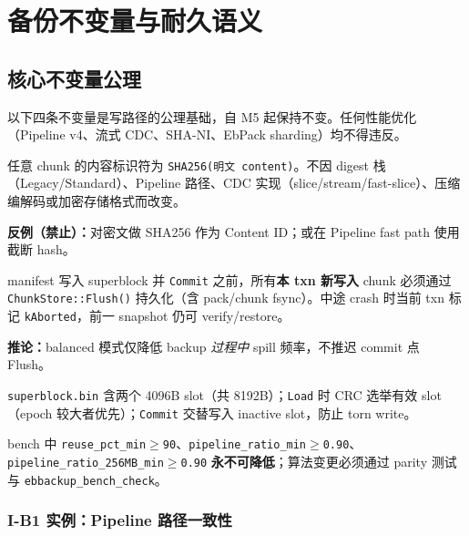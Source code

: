 \chapter{备份不变量与耐久语义}
\label{ch:invariants}

\section{核心不变量公理}

以下四条不变量是写路径的公理基础，自 M5 起保持不变。任何性能优化（Pipeline v4、流式 CDC、SHA-NI、EbPack sharding）均不得违反。

\begin{invariantbox}[I-B1：Content ID 恒定]
任意 chunk 的内容标识符为 \texttt{SHA256(明文 content)}。不因 digest 栈（Legacy/Standard）、Pipeline 路径、CDC 实现（slice/stream/fast-slice）、压缩编解码或加密存储格式而改变。

\textbf{反例（禁止）：}对密文做 SHA256 作为 Content ID；或在 Pipeline fast path 使用截断 hash。
\end{invariantbox}

\begin{invariantbox}[I-B2：提交点耐久性]
manifest 写入 superblock 并 \texttt{Commit} 之前，所有\textbf{本 txn 新写入} chunk 必须通过 \texttt{ChunkStore::Flush()} 持久化（含 pack/chunk fsync）。中途 crash 时当前 txn 标记 \texttt{kAborted}，前一 snapshot 仍可 verify/restore。

\textbf{推论：}balanced 模式仅降低 backup \emph{过程中} spill 频率，不推迟 commit 点 Flush。
\end{invariantbox}

\begin{invariantbox}[I-B3：SuperBlock 双槽]
\texttt{superblock.bin} 含两个 4096B slot（共 8192B）；\texttt{Load} 时 CRC 选举有效 slot（epoch 较大者优先）；\texttt{Commit} 交替写入 inactive slot，防止 torn write。
\end{invariantbox}

\begin{invariantbox}[I-B4：Immutable CI 门禁]
bench 中 \texttt{reuse\_pct\_min$\geq$90}、\texttt{pipeline\_ratio\_min$\geq$0.90}、\texttt{pipeline\_ratio\_256MB\_min$\geq$0.90} \textbf{永不可降低}；算法变更必须通过 parity 测试与 \texttt{ebbackup\_bench\_check}。
\end{invariantbox}

\subsection{I-B1 实例：Pipeline 路径一致性}

